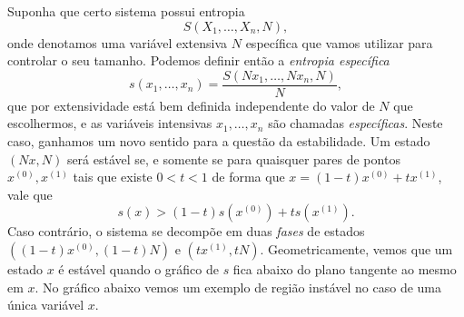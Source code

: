 Suponha que certo sistema possui entropia
$$S(X_1,\dots,X_n,N),$$
onde denotamos uma variável extensiva $N$ específica que vamos utilizar para
controlar o seu tamanho. Podemos definir então a \emph{entropia específica} 
$$s(x_1,\dots,x_n)=\frac{S(Nx_1,\dots,Nx_n,N)}{N},$$
que por extensividade está bem definida independente do valor de $N$ que
escolhermos, e as variáveis intensivas $x_1,\dots,x_n$ são chamadas \emph{
específicas}. Neste caso, ganhamos um novo sentido para a questão da
estabilidade. Um estado $(Nx,N)$ será estável se, e somente se para quaisquer
pares de pontos $x^{(0)},x^{(1)}$ tais que existe $0<t<1$ de forma que $x=(1-t)
x^{(0)}+ tx^{(1)}$, vale que
$$s(x)>(1-t)s(x^{(0)})+ts(x^{(1)}).$$
Caso contrário, o sistema se decompõe em duas \emph{fases} de estados $((1-t)
x^{(0)},(1-t)N)$ e $(tx^{(1)},tN)$. Geometricamente, vemos que um estado $x$ é
estável quando o gráfico de $s$ fica abaixo do plano tangente ao mesmo em $x$.
No gráfico abaixo vemos um exemplo de região instável no caso de uma única
variável $x$.
\begin{figure}[H]
    \centering
\end{figure}
